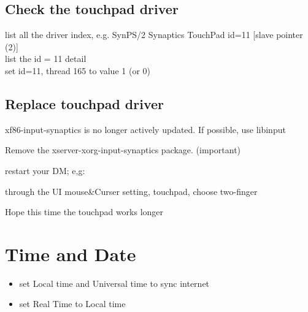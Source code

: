 \subsection{Check the touchpad driver}

 list all the driver index, e.g. SynPS/2 Synaptics TouchPad  id=11	[slave  pointer  (2)]\\
 list the id = 11 detail\\
 set id=11, thread 165 to value 1 (or 0)

\subsection{Replace touchpad driver}

xf86-input-synaptics is no longer actively updated. If possible, use libinput


Remove the xserver-xorg-input-synaptics package. (important)


restart your DM; e,g:

through the UI mouse\&Curser setting, touchpad, choose two-finger 

Hope this time the touchpad works longer


\section{Time and Date}

\begin{itemize}
\item {} set Local time and Universal time to sync internet
\item {} set Real Time to Local time
\end{itemize}

